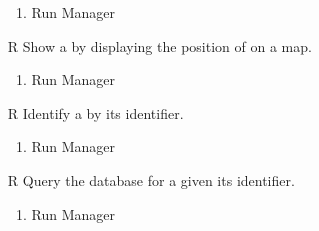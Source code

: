 \begin{itemize}
	\begin{enumerate}
		\item Run Manager
	\end{enumerate}
	\item[R\subs{48}]Show a  by displaying the position of  on a map.
	\begin{enumerate}
		\item Run Manager
	\end{enumerate}
	\item[R\subs{49}]Identify a  by its identifier.
	\begin{enumerate}
		\item Run Manager
	\end{enumerate}
	\item[R\subs{50}]Query the database for a  given its identifier.
	\begin{enumerate}
		\item Run Manager
	\end{enumerate}
\end{itemize}


\thispagestyle{fancy}

